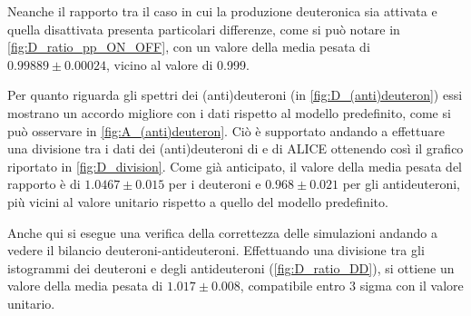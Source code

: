 \begin{figure}[htb]
\begin{subfigure}{.49\textwidth}
        \caption{}
        \label{fig:D_ratio_pp_ON_OFF}
    \end{subfigure}
    \label{fig:D_pp_prod}
\end{figure}
Neanche il rapporto tra il caso in cui la produzione deuteronica sia attivata e quella disattivata presenta particolari differenze, come si può notare in \autoref{fig:D_ratio_pp_ON_OFF}, con un valore della media pesata di $0.99889 \pm 0.00024$, vicino al valore di 0.999.

Per quanto riguarda gli spettri dei (anti)deuteroni (in \autoref{fig:D_(anti)deuteron}) essi mostrano un accordo migliore con i dati rispetto al modello predefinito, come si può osservare in \autoref{fig:A_(anti)deuteron}.
Ciò è supportato andando a effettuare una divisione tra i dati dei (anti)deuteroni di \pythia{} e di ALICE ottenendo così il grafico riportato in \autoref{fig:D_division}.
Come già anticipato, il valore della media pesata del rapporto è di $1.0467 \pm 0.015$ per i deuteroni e $ 0.968 \pm 0.021$ per gli antideuteroni, più vicini al valore unitario rispetto a quello del modello predefinito.

Anche qui si esegue una verifica della correttezza delle simulazioni andando a vedere il bilancio deuteroni-antideuteroni.
Effettuando una divisione tra gli istogrammi dei deuteroni e degli antideuteroni (\autoref{fig:D_ratio_DD}), si ottiene un valore della media pesata di $1.017 \pm 0.008$, compatibile entro 3 sigma con il valore unitario.\\

